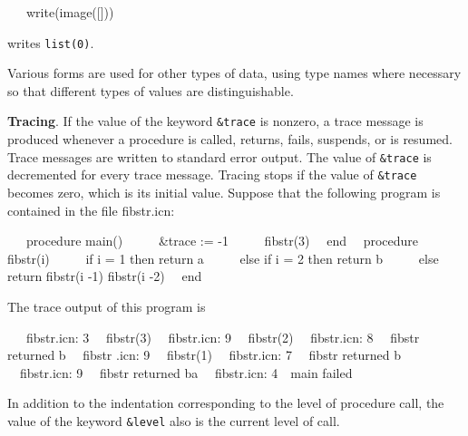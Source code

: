 {\ttfamily\mdseries
\ \ \ write(image([]))}

\noindent writes \texttt{list(0)}.

Various forms are used for other types of data, using type names where
necessary so that different types of values are distinguishable.


\textbf{Tracing}. If the value of the keyword \texttt{\&trace} is
nonzero, a trace message is produced whenever a procedure is called,
returns, fails, suspends, or is resumed. Trace messages are written to
standard error output. The value of \texttt{\&trace} is decremented
for every trace message. Tracing stops if the value of
\texttt{\&trace} becomes zero, which is its initial value. Suppose
that the following program is contained in the file fibstr.icn:

{\ttfamily\mdseries
\ \ \ procedure main()\newline
 \ \ \ \ \ \&trace := -1\newline
 \ \ \ \ \ fibstr(3)\newline
 \ \ end\newline
\newline
 \ \ procedure fibstr(i)\newline
 \ \ \ \ \ if i = 1 then return {\textquotedbl}a{\textquotedbl}\newline
 \ \ \ \ \ else if i = 2 then return {\textquotedbl}b{\textquotedbl}\newline
 \ \ \ \ \ else return fibstr(i -1) {\textbar}{\textbar} fibstr(i -2)\newline
 \ \ end}

The trace output of this program is

{\ttfamily\mdseries
\textrm{\ \ \ fibstr.icn: 3\ \ {\textbar} fibstr(3)}\newline
 \ \ fibstr.icn: 9\ \ {\textbar} {\textbar} fibstr(2)\newline
 \ \ fibstr.icn: 8\ \ {\textbar} {\textbar} fibstr returned {\textquotedbl}b{\textquotedbl}\newline
 \ \ fibstr .icn: 9\ \ {\textbar} {\textbar} fibstr(1)\newline
 \ \ fibstr.icn: 7\ \ {\textbar} {\textbar} fibstr returned {\textquotedbl}b{\textquotedbl}\newline
 \ \ fibstr.icn: 9\ \ {\textbar} fibstr returned {\textquotedbl}ba{\textquotedbl}\newline
 \ \ fibstr.icn: 4\ \ main failed}

In addition to the indentation corresponding to the level of procedure
call, the value of the keyword \texttt{\&level} also is the current
level of call.

